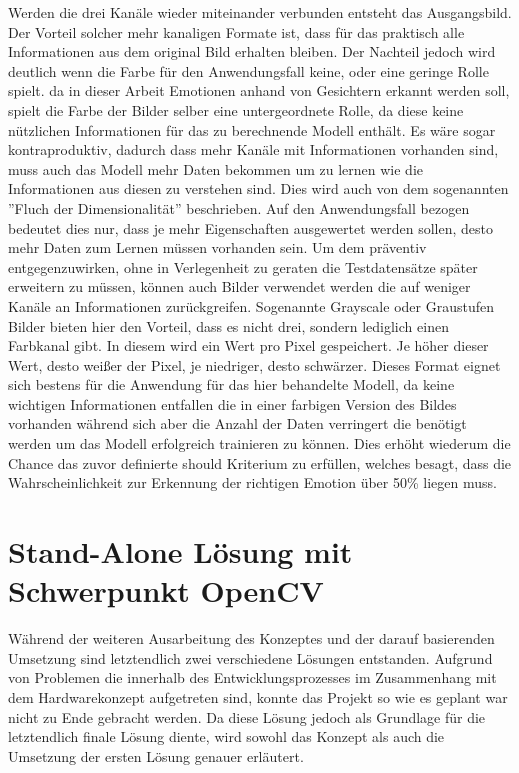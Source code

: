 \documentclass[12pt, a4paper]{report}
\begin{document}
 Werden die drei Kanäle wieder miteinander verbunden entsteht das Ausgangsbild. Der Vorteil solcher mehr kanaligen Formate ist, dass für das praktisch alle Informationen aus dem original Bild erhalten bleiben. Der Nachteil jedoch wird deutlich wenn die Farbe für den Anwendungsfall keine, oder eine geringe Rolle spielt. da in dieser Arbeit Emotionen anhand von Gesichtern erkannt werden soll, spielt die Farbe der Bilder selber eine untergeordnete Rolle, da diese keine nützlichen Informationen für das zu berechnende Modell enthält. Es wäre sogar kontraproduktiv, dadurch dass mehr Kanäle mit Informationen vorhanden sind, muss auch das Modell mehr Daten bekommen um zu lernen wie die Informationen aus diesen zu verstehen sind. Dies wird auch von dem sogenannten ''Fluch der Dimensionalität'' beschrieben. Auf den Anwendungsfall bezogen bedeutet dies nur, dass je mehr Eigenschaften ausgewertet werden sollen, desto mehr Daten zum Lernen müssen vorhanden sein. Um dem präventiv entgegenzuwirken, ohne in Verlegenheit zu geraten die Testdatensätze später erweitern zu müssen, können auch Bilder verwendet werden die auf weniger Kanäle an Informationen zurückgreifen. Sogenannte Grayscale oder Graustufen Bilder bieten hier den Vorteil, dass es nicht drei, sondern lediglich einen Farbkanal gibt. In diesem wird ein Wert pro Pixel gespeichert. Je höher dieser Wert, desto weißer der Pixel, je niedriger, desto schwärzer. Dieses Format eignet sich bestens für die Anwendung für das hier behandelte Modell, da keine wichtigen Informationen entfallen die in einer farbigen Version des Bildes vorhanden während sich aber die Anzahl der Daten verringert die benötigt werden um das Modell erfolgreich trainieren zu können. Dies erhöht wiederum die Chance das zuvor definierte should Kriterium zu erfüllen, welches besagt, dass die Wahrscheinlichkeit zur Erkennung der richtigen Emotion über 50\% liegen muss. 

\let\cleardoublepage\relax

\chapter{Stand-Alone Lösung mit Schwerpunkt OpenCV}
Während der weiteren Ausarbeitung des Konzeptes und der darauf basierenden Umsetzung sind letztendlich zwei verschiedene Lösungen entstanden. Aufgrund von Problemen die innerhalb des Entwicklungsprozesses im Zusammenhang mit dem Hardwarekonzept aufgetreten sind, konnte das Projekt so wie es geplant war nicht zu Ende gebracht werden. Da diese Lösung jedoch als Grundlage für die letztendlich finale Lösung diente, wird sowohl das Konzept als auch die Umsetzung der ersten Lösung genauer erläutert.
\end{document}
